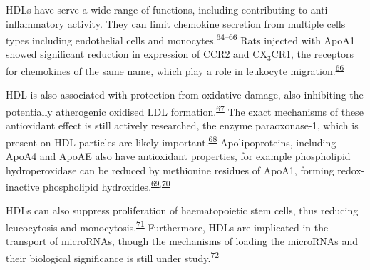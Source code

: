 \documentclass[
]{article}
\begin{document}
HDLs have serve a wide range of functions, including contributing to anti-inflammatory activity.
They can limit chemokine secretion from multiple cells types including endothelial cells and monocytes.\textsuperscript{\protect\hyperlink{ref-cockerill_gillian_w_high-density_1995}{64}--\protect\hyperlink{ref-bursill_christina_a_high-density_2010}{66}}
Rats injected with ApoA1 showed significant reduction in expression of CCR2 and CX\(_3\)CR1, the receptors for chemokines of the same name, which play a role in leukocyte migration.\textsuperscript{\protect\hyperlink{ref-bursill_christina_a_high-density_2010}{66}}

HDL is also associated with protection from oxidative damage, also inhibiting the potentially atherogenic oxidised LDL formation.\textsuperscript{\protect\hyperlink{ref-anatol_small_2003}{67}}
The exact mechanisms of these antioxidant effect is still actively researched, the enzyme paraoxonase-1, which is present on HDL particles are likely important.\textsuperscript{\protect\hyperlink{ref-mackness_role_2004}{68}}
Apolipoproteins, including ApoA4 and ApoAE also have antioxidant properties, for example phospholipid hydroperoxidase can be reduced by methionine residues of ApoA1, forming redox-inactive phospholipid hydroxides.\textsuperscript{\protect\hyperlink{ref-christison_exchange_1995}{69},\protect\hyperlink{ref-zerrad-saadi_amal_hdl3-mediated_2009}{70}}

HDLs can also suppress proliferation of haematopoietic stem cells, thus reducing leucocytosis and monocytosis.\textsuperscript{\protect\hyperlink{ref-yvan-charvet_atp-binding_2010}{71}}
Furthermore, HDLs are implicated in the transport of microRNAs, though the mechanisms of loading the microRNAs and their biological significance is still under study.\textsuperscript{\protect\hyperlink{ref-vickers_micrornas_2011}{72}}
\end{document}
